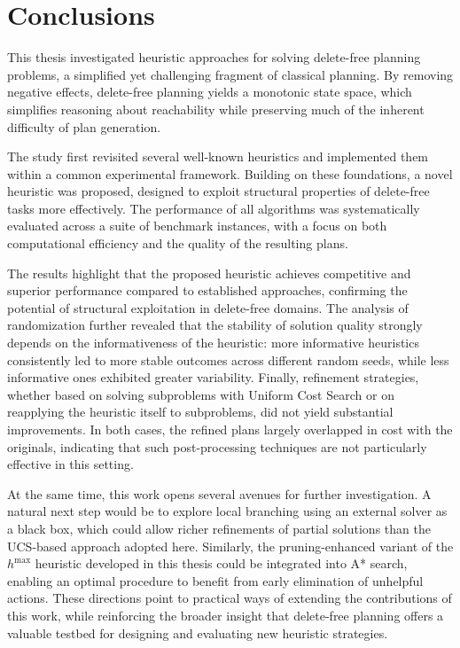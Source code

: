 \chapter{Conclusions}
This thesis investigated heuristic approaches for solving delete-free planning problems, a simplified yet challenging fragment of classical planning.
By removing negative effects, delete-free planning yields a monotonic state space, which simplifies reasoning about reachability while preserving
much of the inherent difficulty of plan generation.

The study first revisited several well-known heuristics and implemented them within a common experimental framework. Building on these foundations,
a novel heuristic was proposed, designed to exploit structural properties of delete-free tasks more effectively. The performance of all algorithms
was systematically evaluated across a suite of benchmark instances, with a focus on both computational efficiency and the quality of the resulting plans.

The results highlight that the proposed heuristic achieves competitive and superior performance compared to established approaches,
confirming the potential of structural exploitation in delete-free domains. The analysis of randomization further revealed that the stability of solution
quality strongly depends on the informativeness of the heuristic: more informative heuristics consistently led to more stable outcomes across different
random seeds, while less informative ones exhibited greater variability. Finally, refinement strategies, whether based on solving subproblems with
Uniform Cost Search or on reapplying the heuristic itself to subproblems, did not yield substantial improvements. In both cases,
the refined plans largely overlapped in cost with the originals, indicating that such post-processing techniques are not particularly effective in this setting.

At the same time, this work opens several avenues for further investigation. A natural next step would be to explore local branching using an external
solver as a black box, which could allow richer refinements of partial solutions than the \textsc{UCS}-based approach adopted here.
Similarly, the pruning-enhanced variant of the $h^{\max}$ heuristic developed in this thesis could be integrated into \textsc{A*} search, enabling an optimal procedure
to benefit from early elimination of unhelpful actions. These directions point to practical ways of extending the contributions of this work,
while reinforcing the broader insight that delete-free planning offers a valuable testbed for designing and evaluating new heuristic strategies.
